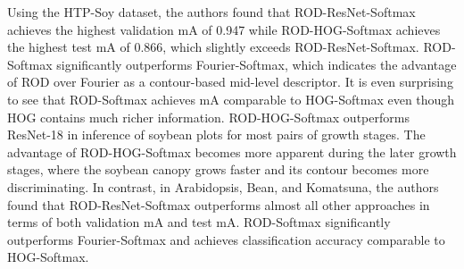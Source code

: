 Using the HTP-Soy dataset, the authors found that ROD-ResNet-Softmax achieves the highest validation mA of 0.947 while ROD-HOG-Softmax achieves the highest test mA
of 0.866, which slightly exceeds ROD-ResNet-Softmax. ROD-Softmax significantly outperforms Fourier-Softmax, which indicates the advantage of ROD over Fourier as a
contour-based mid-level descriptor. It is even surprising to see that ROD-Softmax achieves mA comparable to HOG-Softmax even though HOG contains much richer information.
ROD-HOG-Softmax outperforms ResNet-18 in inference of soybean plots for most pairs of growth stages. The advantage of ROD-HOG-Softmax becomes more apparent during the
later growth stages, where the soybean canopy grows faster and its contour becomes more discriminating. In contrast, in Arabidopsis, Bean, and Komatsuna, the authors
found that ROD-ResNet-Softmax outperforms almost all other approaches in terms of both validation mA and test mA. ROD-Softmax significantly outperforms Fourier-Softmax
and achieves classification accuracy comparable to HOG-Softmax.

